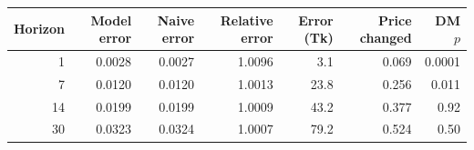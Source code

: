 \begin{tabular}{rrrrrrr}
\toprule
\textbf{Horizon} & \textbf{Model error} & \textbf{Naive error} & \textbf{Relative error} & \textbf{Error (Tk)} & \textbf{Price changed} & \textbf{DM $p$} \\
\midrule
1 & 0.0028 & 0.0027 & 1.0096 & 3.1 & 0.069 & 0.0001 \\
7 & 0.0120 & 0.0120 & 1.0013 & 23.8 & 0.256 & 0.011 \\
14 & 0.0199 & 0.0199 & 1.0009 & 43.2 & 0.377 & 0.92 \\
30 & 0.0323 & 0.0324 & 1.0007 & 79.2 & 0.524 & 0.50 \\
\bottomrule
\end{tabular}
